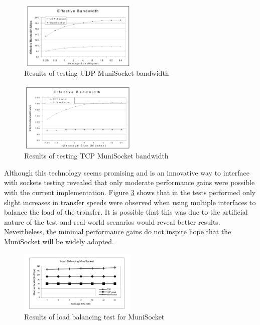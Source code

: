 \documentclass[conference, 12pt]{IEEEtran}
\begin{document}
\begin{figure}[H]
    \centering
    \centerline{\includegraphics[width=0.5\textwidth]{Figure3.png}}
    \caption{Results of testing UDP MuniSocket bandwidth \cite{Mohamed}}
    \label{Figure3}
\end{figure}
\begin{figure}[t]
    \centering
    \centerline{\includegraphics[width=0.5\textwidth]{Figure4.png}}
    \caption{Results of testing TCP MuniSocket bandwidth \cite{Mohamed}}
    \label{Figure4}
\end{figure}

Although this technology seems promising and is an innovative way to interface with sockets testing revealed that only moderate performance gains were possible with the current implementation. Figure \ref{Figure5} shows that in the tests performed only slight increases in transfer speeds were observed when using multiple interfaces to balance the load of the transfer. It is possible that this was due to the artificial nature of the test and real-world scenarios would reveal better results. Nevertheless, the minimal performance gains do not inspire hope that the MuniSocket will be widely adopted.

\begin{figure}[!h]
    \centering
    \centerline{\includegraphics[width=0.5\textwidth]{Figure5.png}}
    \caption{Results of load balancing test for MuniSocket \cite{Mohamed}}
    \label{Figure5}
\end{figure}
\end{document}
